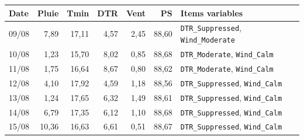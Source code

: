 \footnotesize
\begin{tabular}{lrrrrrl}
\toprule
\rowcolor{NuitBleue!90}
\color{white}\textbf{Date} & \color{white}\textbf{Pluie} & \color{white}\textbf{Tmin} & \color{white}\textbf{DTR} & \color{white}\textbf{Vent} & \color{white}\textbf{PS} & \color{white}\textbf{Items variables} \\
\midrule
09/08 & 7,89 & 17,11 & 4,57 & 2,45 & 88,60 & \texttt{DTR\_Suppressed}, \texttt{Wind\_Moderate} \\
10/08 & 1,23 & 15,70 & 8,02 & 0,85 & 88,68 & \texttt{DTR\_Moderate}, \texttt{Wind\_Calm} \\
11/08 & 1,75 & 16,64 & 8,67 & 0,80 & 88,62 & \texttt{DTR\_Moderate}, \texttt{Wind\_Calm} \\
12/08 & 4,10 & 17,92 & 4,59 & 1,18 & 88,56 & \texttt{DTR\_Suppressed}, \texttt{Wind\_Calm} \\
13/08 & 1,24 & 17,65 & 6,32 & 1,49 & 88,61 & \texttt{DTR\_Suppressed}, \texttt{Wind\_Calm} \\
14/08 & 6,79 & 17,35 & 6,12 & 1,10 & 88,68 & \texttt{DTR\_Suppressed}, \texttt{Wind\_Calm} \\
15/08 & 10,36 & 16,63 & 6,61 & 0,51 & 88,67 & \texttt{DTR\_Suppressed}, \texttt{Wind\_Calm} \\
\bottomrule
\end{tabular}
